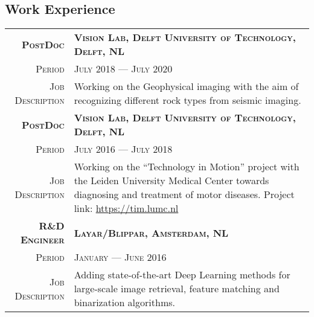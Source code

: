 \documentclass[a4paper, oneside, final]{scrartcl}
\newcommand{\gray}{\rowcolor[gray]{.90}}
\begin{document}
\begin{center}
		\section{Work Experience}
		\begin{tabular}{r@{\hskip 0.3in}p{13.3cm}}

			\gray \textsc{\textbf{PostDoc}}     & \textsc{\textbf{Vision Lab, Delft University of Technology, Delft, NL}}\\
			\textsc{Period}                     & \textsc{July 2018 --- July 2020} \\
			\textsc{Job Description}            & Working on the Geophysical imaging with the aim of recognizing different rock types from seismic imaging. 
            \vspace{5px}\\						%
			\gray \textsc{\textbf{PostDoc}}     & \textsc{\textbf{Vision Lab, Delft University of Technology, Delft, NL}}\\
			\textsc{Period}                     & \textsc{July 2016 --- July 2018} \\
			\textsc{Job Description}            & Working on the ``Technology in Motion'' project with the Leiden University Medical Center 
				towards diagnosing and treatment of motor diseases.
				Project link: \href{https://tim.lumc.nl}{https://tim.lumc.nl}
            \vspace{5px}\\
			\gray \textsc{\textbf{R\&D Engineer}}   & \textsc{\textbf{Layar\slash Blippar, Amsterdam, NL}}\\
			\textsc{Period}                         & \textsc{January --- June 2016} \\
			\textsc{Job Description}                &  Adding state-of-the-art Deep Learning methods for large-scale image retrieval, 
				feature matching and binarization algorithms.\\
		\end{tabular}


\end{center}
\end{document}
